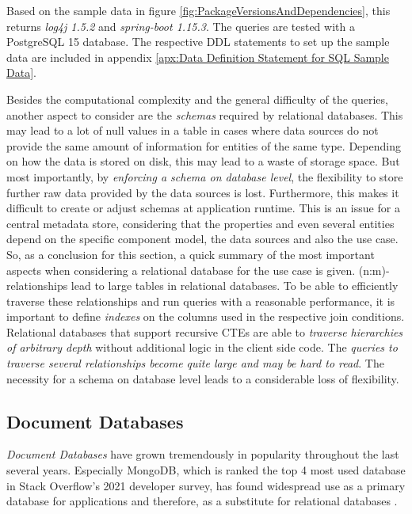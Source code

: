 Based on the sample data in figure \ref{fig:PackageVersionsAndDependencies}, this returns \emph{log4j 1.5.2} and \emph{spring-boot 1.15.3}. The queries are tested with a PostgreSQL 15 database. The respective DDL statements to set up the sample data are included in appendix \ref{apx:Data Definition Statement for SQL Sample Data}.\par
Besides the computational complexity and the general difficulty of the queries, another aspect to consider are the \emph{schemas} required by relational databases. This may lead to a lot of null values in a table in cases where data sources do not provide the same amount of information for entities of the same type. Depending on how the data is stored on disk, this may lead to a waste of storage space. But most importantly, by \emph{enforcing a schema on database level}, the flexibility to store further raw data provided by the data sources is lost. Furthermore, this makes it difficult to create or adjust schemas at application runtime. This is an issue for a central metadata store, considering that the properties and even several entities depend on the specific component model, the data sources and also the use case.\\

So, as a conclusion for this section, a quick summary of the most important aspects when considering a relational database for the use case is given. 
(n:m)-relationships lead to large tables in relational databases. To be able to efficiently traverse these relationships and run queries with a reasonable performance, it is important to define \emph{indexes} on the columns used in the respective join conditions. Relational databases that support recursive CTEs are able to \emph{traverse hierarchies of arbitrary depth} without additional logic in the client side code. The \emph{queries to traverse several relationships become quite large and may be hard to read}. The necessity for a schema on database level leads to a considerable loss of flexibility. 
 
\subsection{Document Databases}
\emph{Document Databases} have grown tremendously in popularity throughout the last several years. Especially MongoDB, which is ranked the top 4 most used database in Stack Overflow's 2021 developer survey, has found widespread use as a primary database for applications and therefore, as a substitute for relational databases \cite{StackoverflowDeveloperSurvey}.

